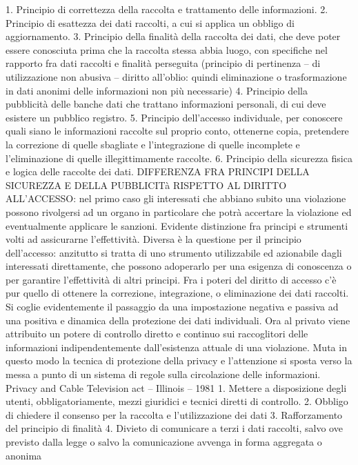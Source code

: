 1.	Principio di correttezza della raccolta e trattamento delle informazioni.
2.	Principio di esattezza dei dati raccolti, a cui si applica un obbligo di aggiornamento.
3.	Principio della finalità della raccolta dei dati, che deve poter essere conosciuta prima che la raccolta stessa abbia luogo, con specifiche nel rapporto fra dati raccolti e finalità perseguita (principio di pertinenza – di utilizzazione non abusiva – diritto all’oblio: quindi eliminazione o trasformazione in dati anonimi delle informazioni non più necessarie)
4.	Principio della pubblicità delle banche dati che trattano informazioni personali, di cui deve esistere un pubblico registro.
5.	Principio dell’accesso individuale, per conoscere quali siano le informazioni raccolte sul proprio conto, ottenerne copia, pretendere la correzione di quelle sbagliate e l’integrazione di quelle incomplete e l’eliminazione di quelle illegittimamente raccolte.
6.	Principio della sicurezza fisica e logica delle raccolte dei dati.
DIFFERENZA FRA PRINCIPI DELLA SICUREZZA E DELLA PUBBLICITà RISPETTO AL DIRITTO ALL’ACCESSO:
nel primo caso gli interessati che abbiano subito una violazione possono rivolgersi ad un organo in particolare che potrà accertare la violazione ed eventualmente applicare le sanzioni. Evidente distinzione fra principi e strumenti volti ad assicurarne l’effettività. Diversa è la questione per il principio dell’accesso: anzitutto si tratta di uno strumento utilizzabile ed azionabile dagli interessati direttamente, che possono adoperarlo per una esigenza di conoscenza o per garantire l’effettività di altri principi. Fra i poteri del diritto di accesso c’è pur quello di ottenere la correzione, integrazione, o eliminazione dei dati raccolti. 
Si coglie evidentemente il passaggio da una impostazione negativa e passiva ad una positiva e dinamica della protezione dei dati individuali. Ora al privato viene attribuito un potere di controllo diretto e continuo sui raccoglitori delle informazioni indipendentemente dall’esistenza attuale di una violazione. Muta in questo modo la tecnica di protezione della privacy e l’attenzione si sposta verso la messa a punto di un sistema di regole sulla circolazione delle informazioni. 
Privacy and Cable Television act – Illinois – 1981
1.	Mettere a disposizione degli utenti, obbligatoriamente, mezzi giuridici e tecnici diretti di controllo.
2.	Obbligo di chiedere il consenso per la raccolta e l’utilizzazione dei dati
3.	Rafforzamento del principio di finalità
4.	Divieto di comunicare a terzi i dati raccolti, salvo ove previsto dalla legge o salvo la comunicazione avvenga in forma aggregata o anonima
